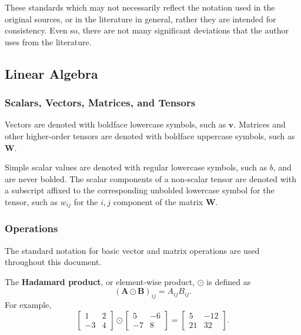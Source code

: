 \documentclass[12pt]{report}
\theoremstyle{definition}
\theoremstyle{remark}
\begin{document}
These standards which may not necessarily reflect the notation used in the original sources, or in the literature in general, rather they are intended for consistency. Even so, there are not many significant deviations that the author uses from the literature.

\subsection{Linear Algebra}
\subsubsection{Scalars, Vectors, Matrices, and Tensors}
Vectors are denoted with boldface lowercase symbols, such as $\mathbf{v}$. Matrices and other higher-order tensors are denoted with boldface uppercase symbols, such as $\mathbf{W}$.

Simple scalar values are denoted with regular lowercase symbols, such as $b$, and are never bolded. The scalar components of a non-scalar tensor are denoted with a subscript affixed to the corresponding unbolded lowercase symbol for the tensor, such as $w_{ij}$ for the $i,j$ component of the matrix $\mathbf{W}$.

\subsubsection{Operations} %
The standard notation for basic vector and matrix operations are used throughout this document.

The \textbf{Hadamard product}, or element-wise product, $\odot$ is defined as
\begin{equation}
    ({{\mathbf{A} \odot \mathbf{B}}})_{ij} = A_{ij}B_{ij}.
\end{equation}
For example,
\begin{equation}
    \begin{bmatrix}
        1 & 2 \\
        -3 & 4
    \end{bmatrix} \odot \begin{bmatrix}
        5 & -6 \\
        -7 & 8
    \end{bmatrix} = \begin{bmatrix}
        5 & -12 \\
        21 & 32
    \end{bmatrix}.
\end{equation}
\end{document}
